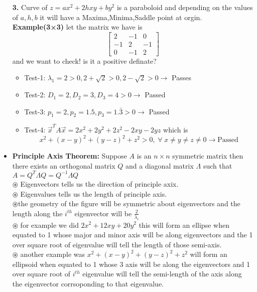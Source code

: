 \documentclass[a4paper,11pt]{article}
\numberwithin{equation}{section}
\begin{document}
\begin{itemize}
\textbf{3.} Curve of $z=ax^2+2hxy+by^2$ is a paraboloid and depending on the values of $a,h,b$ it will have a Maxima,Minima,Saddle point at orgin.\\

\textbf{Example(3×3)} let the matrix we have is 
\[
\begin{bmatrix}
    2&-1&0\\-1&2&-1\\0&-1&2
\end{bmatrix}
\]
and we want to check! is it a positive definate?
\begin{itemize}
    \item Test-1: $\lambda_1=2>0,2+\sqrt{2}>0,2-\sqrt{2}>0\rightarrow$ Passes
    \item Test-2: $D_1=2,D_2=3,D_3=4>0\rightarrow$ Passed
    \item Test-3: $p_1=2,p_2=1.5,p_3=1.\bar{3}>0\rightarrow$ Passed
    \item Test-4: $\vec{x}^TA\vec{x}=2x^2+2y^2+2z^2-2xy-2yz$ which is
    \[x^2+(x-y)^2+(y-z)^2+z^2>0, \hspace{3pt} \forall \hspace{3pt} x\neq y\neq z\neq 0 \rightarrow \text{Passed}\]
\end{itemize}

\item \textbf{Principle Axis Theorem:} Suppose $A$ is an $n\times n$ symmetric matrix then there exists an orthogonal matrix $Q$ and a diagonal matrix $\varLambda$ such that $A=Q^T\varLambda Q=Q^{-1}\varLambda Q$\\

$\circledast$ Eigenvectors tells us the direction of principle axix.\\
$\circledast$ Eigenvalues tells us the length of principle axis.\\

$\circledast$the geometry of the figure will be symmetric about eigenvectors and the length along the $i^{th}$ eigenvector will be $\frac{2}{\lambda_i}$\\

$\circledast$ for example we did $2x^2+12xy+20y^2$ this will form an ellipse when equated to 1 whose major and minor axis will be along eigenvectors and the 1 over square root of eigenvalue will tell the length of those semi-axis.\\

$\circledast$ another example was $x^2+(x-y)^2+(y-z)^2+z^2$ will form an ellipsoid when equated to 1 whose 3 axis will be along the eigenvectors and 1 over square root of $i^{th}$ eigenvalue will tell the semi-length of the axis along the eigenvector corrsoponding to that eigenvalue.\\


\end{itemize}
\end{document}
